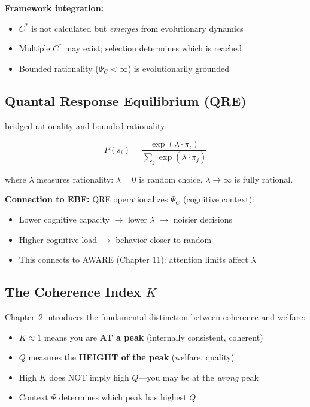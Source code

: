 \textbf{Framework integration:}
\begin{itemize}
\item $C^*$ is not calculated but \textit{emerges} from evolutionary dynamics
\item Multiple $C^*$ may exist; selection determines which is reached
\item Bounded rationality ($\Psi_C < \infty$) is evolutionarily grounded
\end{itemize}

\subsection{Quantal Response Equilibrium (QRE)}

\citet{mckelvey1995} bridged rationality and bounded rationality:

\begin{equation}
\boxed{
P(s_i) = \frac{\exp(\lambda \cdot \pi_i)}{\sum_j \exp(\lambda \cdot \pi_j)}
}
\label{eq:mp-qre}
\end{equation}

where $\lambda$ measures rationality: $\lambda = 0$ is random choice, $\lambda \to \infty$
is fully rational.

\textbf{Connection to EBF:} QRE operationalizes $\Psi_C$ (cognitive context):
\begin{itemize}
\item Lower cognitive capacity $\to$ lower $\lambda$ $\to$ noisier decisions
\item Higher cognitive load $\to$ behavior closer to random
\item This connects to AWARE (Chapter 11): attention limits affect $\lambda$
\end{itemize}

\subsection{The Coherence Index $K$}

Chapter~2 introduces the fundamental distinction between coherence and welfare:

\begin{tcolorbox}[colback=yellow!5!white, colframe=yellow!75!black,
    title=\textbf{K vs Q: The Central Distinction}]

\begin{itemize}
\item $K \approx 1$ means you are \textbf{AT a peak} (internally consistent, coherent)
\item $Q$ measures the \textbf{HEIGHT of the peak} (welfare, quality)
\item High $K$ does NOT imply high $Q$---you may be at the \textit{wrong} peak
\item Context $\Psi$ determines which peak has highest $Q$
\end{itemize}

\end{tcolorbox}

